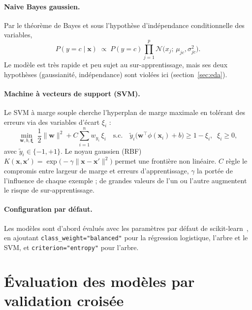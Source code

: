\documentclass[11pt,a4paper]{article}
\newcommand{\code}[1]{\texttt{#1}}
\begin{document}
\paragraph{Naive Bayes gaussien.} Par le théorème de Bayes et sous l'hypothèse d'indépendance conditionnelle des variables,
\begin{equation}
P(y=c \mid \mathbf{x}) \;\propto\; P(y=c)\prod_{j=1}^{p}\mathcal{N}\big(x_j;\,\mu_{jc},\sigma^2_{jc}\big).
\end{equation}
Le modèle est très rapide et peu sujet au sur-apprentissage, mais ses deux hypothèses (gaussianité, indépendance) sont violées ici (section~\ref{sec:eda}).

\paragraph{Machine à vecteurs de support (SVM).} Le SVM à marge souple cherche l'hyperplan de marge maximale en tolérant des erreurs via des variables d'écart $\xi_i$ :
\begin{equation}
\min_{\mathbf{w},b,\boldsymbol{\xi}}\; \frac{1}{2}\|\mathbf{w}\|^2 + C\sum_{i=1}^{n} w_{y_i}\,\xi_i
\quad\text{s.c.}\quad \tilde y_i\big(\mathbf{w}^\top\phi(\mathbf{x}_i)+b\big) \geq 1-\xi_i,\;\; \xi_i\geq 0,
\end{equation}
avec $\tilde y_i\in\{-1,+1\}$. Le noyau gaussien (RBF) $K(\mathbf{x},\mathbf{x}') = \exp\!\big(-\gamma\|\mathbf{x}-\mathbf{x}'\|^2\big)$ permet une frontière non linéaire. $C$ règle le compromis entre largeur de marge et erreurs d'apprentissage, $\gamma$ la portée de l'influence de chaque exemple ; de grandes valeurs de l'un ou l'autre augmentent le risque de sur-apprentissage.

\paragraph{Configuration par défaut.} Les modèles sont d'abord évalués avec les paramètres par défaut de scikit-learn~\cite{pedregosa2011}, en ajoutant \code{class\_weight="balanced"} pour la régression logistique, l'arbre et le SVM, et \code{criterion="entropy"} pour l'arbre.

\section{Évaluation des modèles par validation croisée}\label{sec:evaluation}
\end{document}
